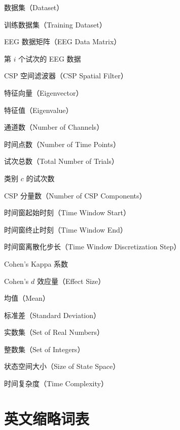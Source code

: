 \begin{description}[font=\normalfont\ttfamily,leftmargin=!,labelwidth=3cm]
\item[$\mathcal{D}$] 数据集（Dataset）
\item[$\mathcal{D}_{\text{train}}$] 训练数据集（Training Dataset）
\item[$\mathbf{X}$] EEG 数据矩阵（EEG Data Matrix）
\item[$\mathbf{X}_i$] 第 $i$ 个试次的 EEG 数据
\item[$\mathbf{W}$] CSP 空间滤波器（CSP Spatial Filter）
\item[$\mathbf{w}$] 特征向量（Eigenvector）
\item[$\lambda$] 特征值（Eigenvalue）
\item[$C$] 通道数（Number of Channels）
\item[$T$] 时间点数（Number of Time Points）
\item[$N$] 试次总数（Total Number of Trials）
\item[$N_c$] 类别 $c$ 的试次数
\item[$m$] CSP 分量数（Number of CSP Components）
\item[$t_{\text{start}}$] 时间窗起始时刻（Time Window Start）
\item[$t_{\text{end}}$] 时间窗终止时刻（Time Window End）
\item[$\Delta t$] 时间窗离散化步长（Time Window Discretization Step）
\item[$\kappa$] Cohen's Kappa 系数
\item[$d$] Cohen's $d$ 效应量（Effect Size）
\item[$\mu$] 均值（Mean）
\item[$\sigma$] 标准差（Standard Deviation）
\item[$\mathbb{R}$] 实数集（Set of Real Numbers）
\item[$\mathbb{Z}$] 整数集（Set of Integers）
\item[$|\mathcal{S}|$] 状态空间大小（Size of State Space）
\item[$O(\cdot)$] 时间复杂度（Time Complexity）

\end{description}

\vspace{2em}


\chapter*{英文缩略词表}

